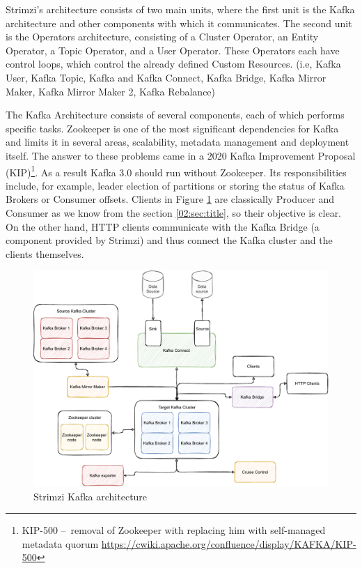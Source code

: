 Strimzi's architecture consists of two main units, where the first unit is the Kafka architecture and other components with which it communicates.
The second unit is the Operators architecture, consisting of a Cluster Operator, an Entity Operator, a Topic Operator, and a User Operator.
These Operators each have control loops, which control the already defined Custom Resources. (i.e, Kafka User, Kafka Topic, Kafka and Kafka Connect, Kafka Bridge, Kafka Mirror Maker, Kafka Mirror Maker 2, Kafka Rebalance)

The Kafka Architecture consists of several components, each of which performs specific tasks.
Zookeeper is one of the most significant dependencies for Kafka and limits it in several areas, scalability, metadata management and deployment itself.
The answer to these problems came in a 2020 Kafka Improvement Proposal (KIP)\footnote{KIP-500 \---\ removal of Zookeeper with replacing him with self-managed metadata quorum \url{https://cwiki.apache.org/confluence/display/KAFKA/KIP-500}}.
As a result Kafka 3.0 should run without Zookeeper.
Its responsibilities include, for example, leader election of partitions or storing the status of Kafka Brokers or Consumer offsets.
Clients in Figure \ref{03:fig:strimziKafkaArchitecture} are classically Producer and Consumer as we know from the section \ref{02:sec:title}, so their objective is clear.
On the other hand, HTTP clients communicate with the Kafka Bridge (a component provided by Strimzi) and thus connect the Kafka cluster and the clients themselves.
\begin{figure}[!ht]
    \centering
    \includegraphics[scale=0.75]{obrazky-figures/02-preliminaries/03-strimzi/03-strimzi-kafka-architecture (1).pdf}
    \caption{Strimzi Kafka architecture}
    \label{03:fig:strimziKafkaArchitecture}
\end{figure}
